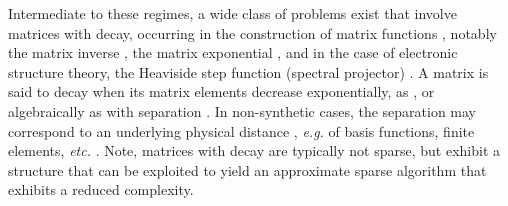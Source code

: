 Intermediate to these regimes, a wide class of problems exist that involve
matrices with decay, occurring in the construction of matrix functions
\cite{benzigolub}, notably the matrix inverse \cite{demkomosssmith,
Benzi:2000:Inv}, the matrix exponential \cite{Iserles:2000:Decay}, and in the
case of electronic structure theory, the Heaviside step function (spectral
projector) \cite{McWeeny12061956, PhysRevB.58.12704, Challacombe:1999:DMM,
Challacombe:2000:SpMM, Benzi:2007:Decay, BenziDecay2012}. A matrix  is said
to decay when its matrix elements decrease exponentially, as , or algebraically as  with separation
. In non-synthetic cases, the separation  may correspond to an
underlying physical distance , \emph{e.g.} of basis
functions, finite elements, \emph{etc.} \cite{BenziDecay2012}. Note, matrices
with decay are typically not sparse, but exhibit a structure that can be
exploited to yield an approximate sparse algorithm that exhibits a reduced
complexity.

